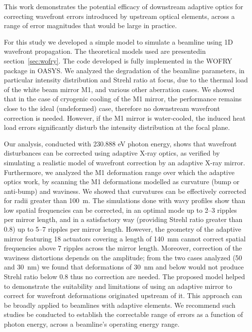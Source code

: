 \documentclass{iucr}
\begin{document}
This work demonstrates the potential efficacy of downstream adaptive optics for correcting wavefront errors introduced by upstream optical elements, across a range of error magnitudes that would be large in practice.

For this study we developed a simple model to simulate a beamline using 1D wavefront propagation. The theoretical models used are presentedin section~\ref{sec:wofry}. The code developed is fully implemented in the WOFRY package in OASYS. We analyzed the degradation of the beamline parameters, in particular intensity distribution and Strehl ratio at focus, due to the thermal load of the white beam mirror M1, and various other aberration cases. We showed that in the case of cryogenic cooling of the M1 mirror, the performance remains close to the ideal (undeformed) case, therefore no downstream wavefront correction is needed. However, if the M1 mirror is water-cooled, the induced heat load errors significantly disturb the intensity distribution at the focal plane.

Our analysis, conducted with 230.888 eV photon energy, shows that wavefront disturbances can be corrected using adaptive X-ray optics, as verified by simulating a realistic model of wavefront correction by an adaptive X-ray mirror. Furthermore, we analyzed the M1 deformation range over which the adaptive optics work, by scanning the M1 deformations modelled as curvature (bump or anti-bump) and waviness. We showed that curvatures can be effectively corrected for radii greater than 100~m. The simulations done with wavy profiles show than low spatial frequencies can be corrected, in an optimal mode up to 2--3 ripples per mirror length, and in a satisfactory way (providing Strehl ratio greater than 0.8) up to 5--7 ripples per mirror length. However, the geometry of the adaptive mirror featuring 18 actuators covering a length of 140~mm cannot correct spatial frequencies above 7 ripples across the mirror length. Moreover, correction of the waviness distortions depends on the amplitude; from the two cases analyzed (50 and 30~nm) we found that deformations of 30~nm and below would not produce Strehl ratio below 0.8 thus no correction are needed. The proposed model helped to demonstrate the suitability and limitations of using an adaptive mirror to correct for wavefront deformations originated upstream of it. This approach can be broadly applied to beamlines with adaptive elements. We recommend such studies be conducted to establish the correctable range of errors as a function of photon energy, across a beamline's operating energy range.
\end{document}
